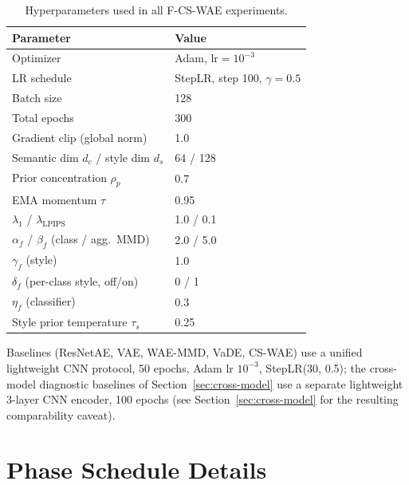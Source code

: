 \documentclass[10pt,letterpaper]{article}
\newcommand{\ours}{F-CS-WAE}
\newcommand{\simple}{CS-WAE}
\begin{document}
\begin{table}[h]
\centering
\small
\caption{Hyperparameters used in all \ours{} experiments.}
\label{tab:hyperparams}
\begin{tabular}{ll}
\toprule
Parameter & Value \\
\midrule
Optimizer & Adam, $\mathrm{lr}=10^{-3}$ \\
LR schedule & StepLR, step 100, $\gamma=0.5$ \\
Batch size & 128 \\
Total epochs & 300 \\
Gradient clip (global norm) & 1.0 \\
Semantic dim $d_c$ / style dim $d_s$ & 64 / 128 \\
Prior concentration $\rho_p$ & 0.7 \\
EMA momentum $\tau$ & 0.95 \\
$\lambda_1$ / $\lambda_{\mathrm{LPIPS}}$ & 1.0 / 0.1 \\
$\alpha_f$ / $\beta_f$ (class / agg.\ MMD) & 2.0 / 5.0 \\
$\gamma_f$ (style) & 1.0 \\
$\delta_f$ (per-class style, off/on) & 0 / 1 \\
$\eta_f$ (classifier) & 0.3 \\
Style prior temperature $\tau_s$ & 0.25 \\
\bottomrule
\end{tabular}
\end{table}

Baselines (ResNetAE, VAE, WAE-MMD, VaDE, \simple{}) use a unified
lightweight CNN protocol, 50 epochs, Adam lr $10^{-3}$, StepLR(30, 0.5); the
cross-model diagnostic baselines of Section~\ref{sec:cross-model} use a
separate lightweight 3-layer CNN encoder, 100 epochs (see
Section~\ref{sec:cross-model} for the resulting comparability caveat).

\section{Phase Schedule Details}
\label{app:schedule}
\end{document}
